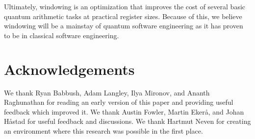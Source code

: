 \documentclass[onecolumn,unpublished]{quantumarticle}
\theoremstyle{definition}
\theoremstyle{definition}
\theoremstyle{definition}
\begin{document}
Ultimately, windowing is an optimization that improves the cost of several basic quantum arithmetic tasks at practical register sizes.
Because of this, we believe windowing will be a mainstay of quantum software engineering as it has proven to be in classical software engineering.


\section{Acknowledgements}
We thank Ryan Babbush, Adam Langley, Ilya Mironov, and Ananth Raghunathan for reading an early version of this paper and providing useful feedback which improved it.
We thank Austin Fowler, Martin Ekerå, and Johan Håstad for useful feedback and discussions.
We thank Hartmut Neven for creating an environment where this research was possible in the first place.



\end{document}
